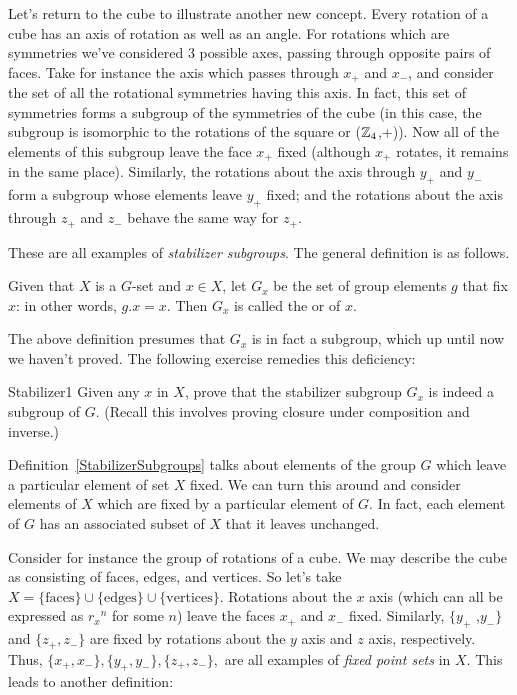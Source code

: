 Let's return to the cube to illustrate another new concept. Every rotation of a cube has an axis of rotation as well as an angle.   
 For rotations which are symmetries we've considered 3 possible axes, passing through opposite pairs of faces. 
Take for instance the axis which passes through $x_+$ and $x_-$, and consider the set of all the rotational symmetries having this axis.
In fact, this set of symmetries forms a subgroup  of the symmetries of the cube (in this case, the subgroup is isomorphic to the rotations of the square or ($\mathbb{Z}_4$,+)). Now all of the elements of this subgroup leave the face  $x_+$ fixed (although $x_+$ rotates, it remains in the same place).
Similarly, the rotations about the axis through $y_+$ and $y_-$ form a subgroup whose elements leave  $y_+$ fixed; and the rotations about the axis through $z_+$ and $z_-$ behave the same way for $z_+$.  

 These are all examples of \emph{stabilizer subgroups}. The general definition is as follows.

\begin{defn}\label{StabilizerSubgroups} 
Given that $X$ is a $G$-set and  $x \in X$, let $G_x$ be the set of  group elements $g$ that fix $x$:  in other words, $g.x=x$.  Then $G_x$ is called the  or  of $x$.
\end{defn}

The above definition presumes that $G_x$ is in fact a subgroup, which up until now we haven't proved. The following exercise remedies this deficiency:

\begin{exercise}{Stabilizer1}
Given any $x$ in $X$, prove that the stabilizer subgroup $G_x$  is indeed a subgroup of $G$.  (Recall this involves proving closure under composition and inverse.)
\end {exercise}

Definition~\ref{StabilizerSubgroups} talks about elements of the group $G$ which leave a particular element of set $X$ fixed. We can turn this around and consider elements of $X$ which are fixed by a particular element of $G$. In fact, each element of $G$ has an associated subset of $X$ that it leaves unchanged. 

Consider for instance the group of rotations of a cube. We may describe the cube as consisting of faces, edges, and vertices. So let's take   $X=\{\text{faces}\}\cup\{\text{edges}\}\cup\{\text{vertices}\}$.  Rotations about the $x$ axis (which can all be expressed as ${r_x}^n$ for some $n$) leave the faces $x_+$ and $x_-$ fixed. Similarly, $\{y_+$ ,$y_-\}$ and $\{z_+,z_-\}$ are  fixed by rotations about the $y$ axis and $z$ axis, respectively.   Thus, $\{x_+,x_-\},\{y_+,y_-\},\{z_+,z_-\},$  are all examples of \emph{fixed point sets} in $X$.
This leads to another definition:


